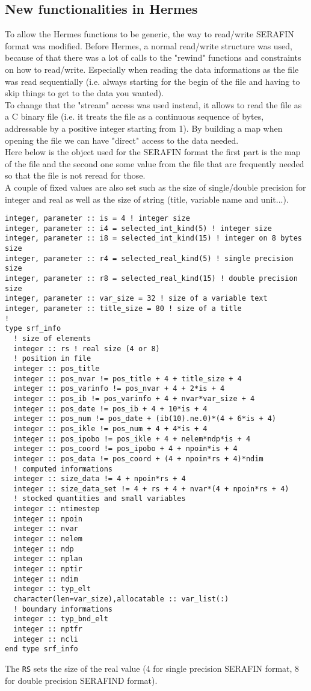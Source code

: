 %
\subsection{New functionalities in Hermes}
%
To allow the Hermes functions to be generic, the way to read/write SERAFIN
format was modified. Before Hermes, a normal read/write structure was used,
because of that there was a lot of calls to the "rewind" functions and
constraints on how to read/write. Especially when reading the data informations
as the file was read sequentially (i.e. always starting for the begin of the
file and having to skip things to get to the data you wanted).\\
%
To change that the "stream" access was used instead, it allows to read the file
as a C binary file (i.e. it treats the file as a continuous sequence of bytes,
addressable by a positive integer starting from 1). By building a map when
opening the file we can have "direct" access to the data needed.\\
%
Here below is the object used for the SERAFIN format the first part is the map
of the file and the second one some value from the file that are frequently
needed so that the file is not reread for those.\\
%
A couple of fixed values are also set such as the size of single/double
precision for integer and real as well as the size of string (title, variable
name and unit...).
%
\begin{lstlisting} 
integer, parameter :: is = 4 ! integer size
integer, parameter :: i4 = selected_int_kind(5) ! integer size
integer, parameter :: i8 = selected_int_kind(15) ! integer on 8 bytes size
integer, parameter :: r4 = selected_real_kind(5) ! single precision size
integer, parameter :: r8 = selected_real_kind(15) ! double precision size
integer, parameter :: var_size = 32 ! size of a variable text
integer, parameter :: title_size = 80 ! size of a title
!
type srf_info
  ! size of elements
  integer :: rs ! real size (4 or 8)
  ! position in file
  integer :: pos_title 
  integer :: pos_nvar != pos_title + 4 + title_size + 4
  integer :: pos_varinfo != pos_nvar + 4 + 2*is + 4
  integer :: pos_ib != pos_varinfo + 4 + nvar*var_size + 4
  integer :: pos_date != pos_ib + 4 + 10*is + 4
  integer :: pos_num != pos_date + (ib(10).ne.0)*(4 + 6*is + 4)
  integer :: pos_ikle != pos_num + 4 + 4*is + 4 
  integer :: pos_ipobo != pos_ikle + 4 + nelem*ndp*is + 4
  integer :: pos_coord != pos_ipobo + 4 + npoin*is + 4
  integer :: pos_data != pos_coord + (4 + npoin*rs + 4)*ndim
  ! computed informations
  integer :: size_data != 4 + npoin*rs + 4
  integer :: size_data_set != 4 + rs + 4 + nvar*(4 + npoin*rs + 4)
  ! stocked quantities and small variables
  integer :: ntimestep
  integer :: npoin
  integer :: nvar
  integer :: nelem
  integer :: ndp
  integer :: nplan
  integer :: nptir
  integer :: ndim
  integer :: typ_elt
  character(len=var_size),allocatable :: var_list(:) 
  ! boundary informations
  integer :: typ_bnd_elt
  integer :: nptfr
  integer :: ncli
end type srf_info
\end{lstlisting}
%
The \verb!RS! sets the size of the real value (4 for single precision SERAFIN
format, 8 for double precision SERAFIND format).
%
